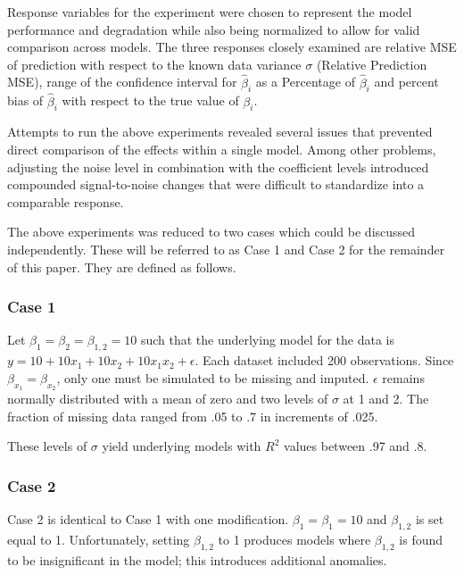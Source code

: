 \documentclass[../../paper.tex]{subfiles}
\begin{document}
Response variables for the experiment were chosen to represent the model performance
and degradation while also being normalized to allow for valid comparison across
models. The three responses closely examined are relative MSE of prediction
with respect to the known data variance $\sigma$ (Relative Prediction MSE), range of the confidence interval for $\hat{\beta}_{i}$ as a Percentage of $\hat{\beta}_{i}$
and percent bias of $\hat{\beta}_{i}$ with respect to the true value of $\beta_{i}$.

Attempts to run the above experiments revealed several issues that prevented direct comparison of the effects within a single model. Among other problems, adjusting the noise level in combination with the coefficient levels introduced compounded signal-to-noise changes that were difficult to standardize into a comparable response.

The above experiments was reduced to two cases which could be discussed independently.
These will be referred to as Case 1 and Case 2 for the remainder of this paper.
They are defined as follows.

\subsubsection{Case 1}
Let $\beta_{ 1} = \beta_{2} = \beta_{1,2} = 10$ such that the underlying model for the data is $y = 10 + 10x_{1} + 10x_{2} + 10x_{1}x_{2} + \epsilon $.
Each dataset included 200 observations.
Since $\beta_{ x_{1}} = \beta_{ x_{2}}$, only one must be simulated to be missing and imputed.
$\epsilon $ remains normally distributed with a mean of zero and two levels of $\sigma$ at 1 and 2. The fraction of missing data ranged from .05 to .7 in increments of .025.

These levels of $\sigma$ yield underlying models with $R^2$ values between .97 and .8.

\subsubsection{Case 2}

Case 2 is identical to Case 1 with one modification. $\beta_{1} = \beta_{1} = 10$ and $\beta_{1,2}$ is set equal to 1. Unfortunately, setting $\beta_{1,2}$ to 1 produces models where $\beta_{1,2}$ is found to be insignificant in the model; this introduces additional anomalies.


\end{document}
